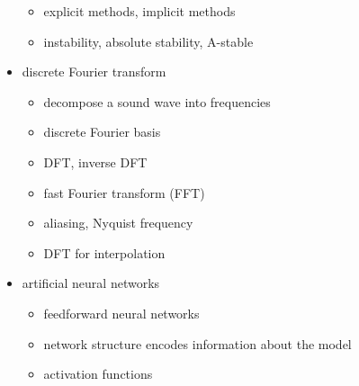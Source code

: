 \documentclass[12pt,letterpaper,noanswers]{exam}
\begin{document}
\begin{itemize}
\begin{itemize}
        \item explicit methods, implicit methods
        \item instability, absolute stability, A-stable
    \end{itemize}
    \item discrete Fourier transform
    \begin{itemize}
    \itemsep0pt
        \item decompose a sound wave into frequencies
        \item discrete Fourier basis
        \item DFT, inverse DFT
        \item fast Fourier transform (FFT)
        \item aliasing, Nyquist frequency
        \item DFT for interpolation
    \end{itemize}
    \item artificial neural networks
    \begin{itemize}
    \itemsep0pt
        \item feedforward neural networks
        \item network structure encodes information about the model
        \item activation functions
    \end{itemize}
\end{itemize}





\end{document}
